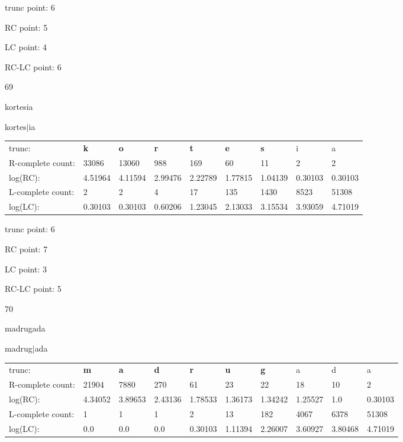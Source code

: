 \documentclass{article}
\begin{document}
trunc point: 6

RC point: 5

LC point: 4

RC-LC point: 6

\vspace{3em}



69

kortesia

kortes$|$ia

\vspace{1em}

\begin{tabular}{l|llllllll}

trunc: & {\color{red}\bf k} & {\color{red}\bf o} & {\color{red}\bf r} & {\color{red}\bf t} & {\color{red}\bf e} & {\color{red}\bf s} & i & a \\ 
R-complete count: & 33086 & 13060 & 988 & 169 & 60 & 11 & 2 & 2 \\ 
log(RC): & 4.51964 & 4.11594 & 2.99476 & 2.22789 & 1.77815 & 1.04139 & 0.30103 & 0.30103 \\ 
L-complete count: & 2 & 2 & 4 & 17 & 135 & 1430 & 8523 & 51308 \\ 
log(LC): & 0.30103 & 0.30103 & 0.60206 & 1.23045 & 2.13033 & 3.15534 & 3.93059 & 4.71019 \\ 
\end{tabular}

trunc point: 6

RC point: 7

LC point: 3

RC-LC point: 5

\vspace{3em}



70

madrugada

madrug$|$ada

\vspace{1em}

\begin{tabular}{l|lllllllll}

trunc: & {\color{red}\bf m} & {\color{red}\bf a} & {\color{red}\bf d} & {\color{red}\bf r} & {\color{red}\bf u} & {\color{red}\bf g} & a & d & a \\ 
R-complete count: & 21904 & 7880 & 270 & 61 & 23 & 22 & 18 & 10 & 2 \\ 
log(RC): & 4.34052 & 3.89653 & 2.43136 & 1.78533 & 1.36173 & 1.34242 & 1.25527 & 1.0 & 0.30103 \\ 
L-complete count: & 1 & 1 & 1 & 2 & 13 & 182 & 4067 & 6378 & 51308 \\ 
log(LC): & 0.0 & 0.0 & 0.0 & 0.30103 & 1.11394 & 2.26007 & 3.60927 & 3.80468 & 4.71019 \\ 
\end{tabular}
\end{document}
